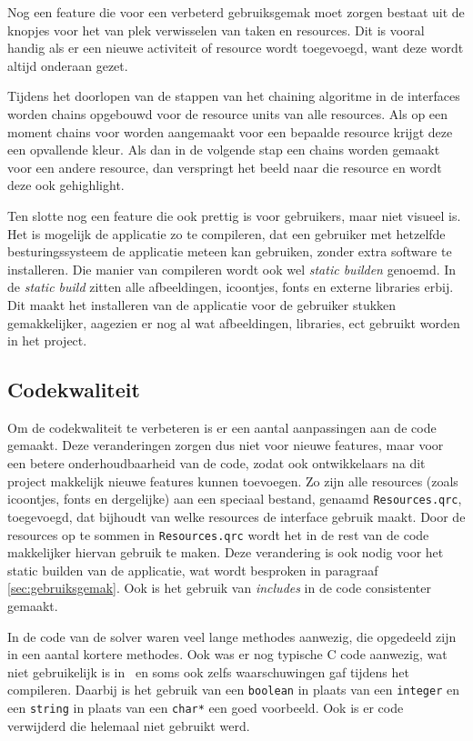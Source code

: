 Nog een feature die voor een verbeterd gebruiksgemak moet zorgen bestaat uit de knopjes voor het van plek verwisselen van taken en resources. Dit is vooral handig als er een nieuwe activiteit of resource wordt toegevoegd, want deze wordt altijd onderaan gezet. 

Tijdens het doorlopen van de stappen van het chaining algoritme in de interfaces worden chains opgebouwd voor de resource units van alle resources. Als op een moment chains voor worden aangemaakt voor een bepaalde resource krijgt deze een opvallende kleur. Als dan in de volgende stap een chains worden gemaakt voor een andere resource, dan verspringt het beeld naar die resource en wordt deze ook gehighlight. 

Ten slotte nog een feature die ook prettig is voor gebruikers, maar niet visueel is. Het is mogelijk de applicatie zo te compileren, dat een gebruiker met hetzelfde besturingssysteem de applicatie meteen kan gebruiken, zonder extra software te installeren. Die manier van compileren wordt ook wel \emph{static builden} genoemd. In de \emph{static build} zitten alle afbeeldingen, icoontjes, fonts en externe libraries erbij. Dit maakt het installeren van de applicatie voor de gebruiker stukken gemakkelijker, aagezien er nog al wat afbeeldingen, libraries, ect gebruikt worden in het project. 

\subsection{Codekwaliteit}
Om de codekwaliteit te verbeteren is er een aantal aanpassingen aan de code gemaakt. Deze veranderingen zorgen dus niet voor nieuwe features, maar voor een betere onderhoudbaarheid van de code, zodat ook ontwikkelaars na dit project makkelijk nieuwe features kunnen toevoegen. Zo zijn alle resources (zoals icoontjes, fonts en dergelijke) aan een speciaal bestand, genaamd \texttt{Resources.qrc}, toegevoegd, dat bijhoudt van welke resources de interface gebruik maakt. Door de resources op te sommen in \texttt{Resources.qrc} wordt het in de rest van de code makkelijker hiervan gebruik te maken. Deze verandering is ook nodig voor het static builden van de applicatie, wat wordt besproken in paragraaf \ref{sec:gebruiksgemak}. Ook is het gebruik van \emph{includes} in de code consistenter gemaakt.

In de code van de solver waren veel lange methodes aanwezig, die opgedeeld zijn in een aantal kortere methodes. Ook was er nog typische C code aanwezig, wat niet gebruikelijk is in \cpp\ en soms ook zelfs waarschuwingen gaf tijdens het compileren. Daarbij is het gebruik van een \texttt{boolean} in plaats van een \texttt{integer} en een \texttt{string} in plaats van een \texttt{char*} een goed voorbeeld. Ook is er code verwijderd die helemaal niet gebruikt werd.

